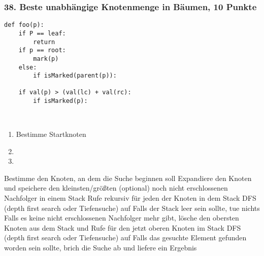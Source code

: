 \documentclass[ngerman,a4paper]{report}
\begin{document}
\subsubsection*{38. Beste unabhängige Knotenmenge in Bäumen, 10 Punkte}

\begin{lstlisting}
def foo(p):
	if P == leaf:
		return
	if p == root:
		mark(p)
	else:
		if isMarked(parent(p)):
			
	if val(p) > (val(lc) + val(rc):
		if isMarked(p):
			
		
\end{lstlisting}

\begin{enumerate}
\item Bestimme Startknoten
\item 
\item 
\end{enumerate}
    Bestimme den Knoten, an dem die Suche beginnen soll
    Expandiere den Knoten und speichere den kleinsten/größten (optional) noch nicht erschlossenen Nachfolger in einem Stack
    Rufe rekursiv für jeden der Knoten in dem Stack DFS (depth first search oder Tiefensuche) auf
        Falls der Stack leer sein sollte, tue nichts
        Falls es keine nicht erschlossenen Nachfolger mehr gibt, lösche den obersten Knoten aus dem Stack und Rufe für den jetzt oberen Knoten im Stack DFS (depth first search oder Tiefensuche) auf
        Falls das gesuchte Element gefunden worden sein sollte, brich die Suche ab und liefere ein Ergebnis
\end{document}
